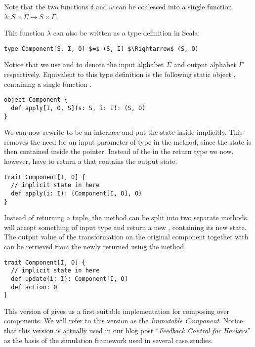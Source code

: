 Note that the two functions $\delta$ and $\omega$ can be coalesced into a single function $\lambda: S \times \Sigma \rightarrow S \times \Gamma$.

This function $\lambda$ can also be written as a type definition in Scala:

\begin{lstlisting}[style=InlineScalaStyle]
type Component[S, I, O] $=$ (S, I) $\Rightarrow$ (S, O)
\end{lstlisting}

Notice that we use  and  to denote the input alphabet $\Sigma$ and output alphabet $\Gamma$ respectively. Equivalent to this type definition is the following static object \comp, containing a single function .

\begin{lstlisting}[style=InlineScalaStyle]
object Component {
  def apply[I, O, S](s: S, i: I): (S, O)
}
\end{lstlisting}

We can now rewrite \comp to be an interface and put the state  inside \comp implicitly. This removes the need for an input parameter of type  in the  method, since the state is then contained inside the  pointer. Instead of the  in the return type we now, however, have to return a \comp that contains the output state.

\begin{lstlisting}[style=InlineScalaStyle]
trait Component[I, O] {
  // implicit state in here
  def apply(i: I): (Component[I, O], O)
}
\end{lstlisting}

Instead of returning a tuple, the  method can be split into two separate methods.  will accept something of input type  and return a new \comp, containing its new state. The output value of the transformation on the original component together with  can be retrieved from the newly returned \comp using the  method.

\begin{lstlisting}[style=InlineScalaStyle]
trait Component[I, O] {
  // implicit state in here
  def update(i: I): Component[I, O]
  def action: O
}
\end{lstlisting}

This version of \comp gives us a first suitable implementation for composing over components. We will refer to this version as the \textit{Immutable Component}. Notice that this version is actually used in our blog post ``\textit{Feedback Control for Hackers}'' \cite{heest2015-feedback-for-hackers} as the basis of the simulation framework used in several case studies.

